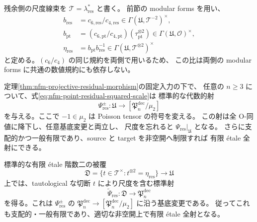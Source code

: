 残余側の尺度線束を $\mathscr T=\lambda_{\mathrm{res}}^*$ と書く。
前節の modular forms を用い、
\begin{equation}\label{eq:nfm-point-residual-squared-scale}
 \begin{split}
 b_{\mathrm{res}}&=c_{6,\mathrm{res}}/c_{4,\mathrm{res}}
       \in\Gamma(\mathfrak U,\mathscr T^{-2})^\times,\\
 b_{\mathrm{pt}}&=
 (c_{6,\mathrm{pt}}/c_{4,\mathrm{pt}})
          (\tau_{\mathrm{pt}}^{\otimes2})
       \in\Gamma(\mathfrak U,\mathcal O)^\times,\\
 \eta_{\mathrm{res}}&=b_{\mathrm{pt}}b_{\mathrm{res}}^{-1}
       \in\Gamma(\mathfrak U,\mathscr T^{\otimes2})^\times
 \end{split}
\end{equation}
と定める。$(c_6/c_4)$ の同じ規約を両側で用いるため、
この比は両側の modular forms に共通の数値規約にも依存しない。

\begin{theorem}[符号を除いた標準尺度と支配的な残余射]
\label{thm:nfm-canonical-signed-residual-map}
定理\ref{thm:nfm-projective-residual-morphism}の固定入力の下で、
任意の $n\ge3$ について、式\eqref{eq:nfm-point-residual-squared-scale}は
標準的な代数的射
\[
 \Psi_{\mathrm{res}}^{\pm}:\mathfrak U\longrightarrow
       [\mathfrak P_n^{\mathrm{dec}}/\mu_2]
\]
を与える。ここで $-1\in\mu_2$ は Poisson tensor の符号を変える。
この射は全 O-同値に降下し、任意基底変更と両立し、
尺度を忘れると $\Psi_{\mathrm{res}}|_{\mathfrak U}$ となる。
さらに支配的かつ一般有限であり、source と target を非空開へ制限すれば
有限 \'etale 全射にできる。

標準的な有限 \'etale 階数二の被覆
\begin{equation}\label{eq:nfm-point-normalized-scale-cover}
 \mathfrak D=
 \{t\in\mathscr T^\times:t^{\otimes2}=\eta_{\mathrm{res}}\}
 \longrightarrow\mathfrak U
\end{equation}
上では、tautological な切断 $t$ により尺度を含む標準射
\[
 \widetilde\Psi_{\mathrm{res}}:\mathfrak D
       \longrightarrow\mathfrak P_n^{\mathrm{dec}}
\]
を得る。これは $\Psi_{\mathrm{res}}^{\pm}$ の
$\mathfrak P_n^{\mathrm{dec}}\to[\mathfrak P_n^{\mathrm{dec}}/\mu_2]$
に沿う基底変更である。
従ってこれも支配的・一般有限であり、適切な非空開上で有限 \'etale 全射となる。
\end{theorem}

